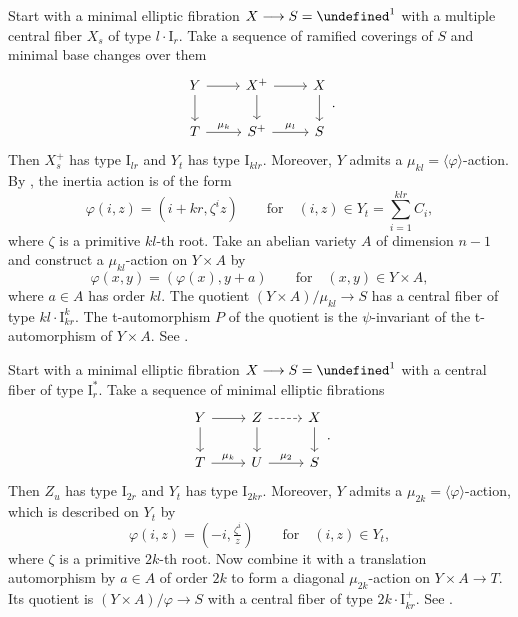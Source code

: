 \documentclass[reqno, letterpaper]{amsart}
\numberwithin{equation}{subsection}
\let\AA\undefined
\let\to\longrightarrow
\newcommand{\AA}{\mathbb{A}}
\begin{document}
	\begin{example} [Type $m \cdot \mathrm I^k_R$ for $m = kl$ and $R = kr$] \label{ex:mIr}
		Start with a minimal elliptic fibration $X \to S = \AA^1$ with a multiple central fiber $X_s$ of type $l \cdot \mathrm I_r$. Take a sequence of ramified coverings of $S$ and minimal base changes over them
		\[\begin{tikzcd}
			Y \arrow[r] \arrow[d] & X^+ \arrow[r] \arrow[d] & X \arrow[d] \\
			T \arrow[r, "\mu_k"] & S^+ \arrow[r, "\mu_l"] & S
		\end{tikzcd}.\]
		Then $X_s^+$ has type $\mathrm I_{lr}$ and $Y_t$ has type $\mathrm I_{klr}$. Moreover, $Y$ admits a $\mu_{kl} = \langle \varphi \rangle$-action. By , the inertia action is of the form
		\[ \varphi (i,z) = (i + kr, \zeta^i z) \qquad\mbox{for}\quad (i,z) \in Y_t = \sum_{i=1}^{klr} C_i ,\]
		where $\zeta$ is a primitive $kl$-th root. Take an abelian variety $A$ of dimension $n-1$ and construct a $\mu_{kl}$-action on $Y \times A$ by
		\[ \varphi (x, y) = (\varphi(x), y + a) \qquad\mbox{for}\quad (x,y) \in Y \times A ,\]
		where $a \in A$ has order $kl$. The quotient $(Y \times A)/\mu_{kl} \to S$ has a central fiber of type $kl \cdot \mathrm I^k_{kr}$. The t-automorphism $P$ of the quotient is the $\psi$-invariant of the t-automorphism of $Y \times A$. See .
	\end{example}
	
	\begin{example} [Type $m \cdot \mathrm I^+_R$ for $m = 2k$ and $R = kr$] \label{ex:2kIkr+}
		Start with a minimal elliptic fibration $X \to S = \AA^1$ with a central fiber of type $\mathrm I_r^*$. Take a sequence of minimal elliptic fibrations
		\[\begin{tikzcd}
			Y \arrow[r] \arrow[d] & Z \arrow[r, dashed] \arrow[d] & X \arrow[d] \\
			T \arrow[r, "\mu_k"] & U \arrow[r, "\mu_2"] & S
		\end{tikzcd}.\]
		Then $Z_u$ has type $\mathrm I_{2r}$ and $Y_t$ has type $\mathrm I_{2kr}$. Moreover, $Y$ admits a $\mu_{2k} = \langle \varphi \rangle$-action, which is described on $Y_t$ by
		\[ \varphi (i,z) = (-i, \tfrac{\zeta^i}{z}) \qquad\mbox{for}\quad (i,z) \in Y_t ,\]
		where $\zeta$ is a primitive $2k$-th root. Now combine it with a translation automorphism by $a \in A$ of order $2k$ to form a diagonal $\mu_{2k}$-action on $Y \times A \to T$. Its quotient is $(Y \times A)/\varphi \to S$ with a central fiber of type $2k \cdot \mathrm I^+_{kr}$. See .
	\end{example}
	
\end{document}
